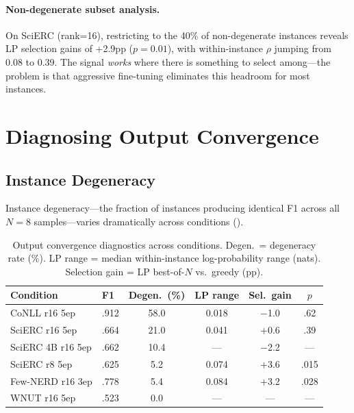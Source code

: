\documentclass[11pt,a4paper]{article}
\begin{document}
\paragraph{Non-degenerate subset analysis.}
On SciERC (rank=16), restricting to the 40\% of non-degenerate instances reveals LP selection gains of +2.9pp ($p{=}0.01$), with within-instance $\rho$ jumping from 0.08 to 0.39.
The signal \emph{works} where there is something to select among---the problem is that aggressive fine-tuning eliminates this headroom for most instances.

\section{Diagnosing Output Convergence}

\subsection{Instance Degeneracy}

Instance degeneracy---the fraction of instances producing identical F1 across all $N{=}8$ samples---varies dramatically across conditions ().

\begin{table}[t]
\centering
\small
\caption{Output convergence diagnostics across conditions. Degen.\ = degeneracy rate (\%). LP range = median within-instance log-probability range (nats). Selection gain = LP best-of-$N$ vs.\ greedy (pp).}
\label{tab:convergence}
\begin{tabular}{llcccc}
\toprule
\textbf{Condition} & \textbf{F1} & \textbf{Degen.\ (\%)} & \textbf{LP range} & \textbf{Sel.\ gain} & \textbf{$p$} \\
\midrule
CoNLL r16 5ep         & .912 & 58.0 & 0.018 & $-$1.0 & .62 \\
SciERC r16 5ep        & .664 & 21.0 & 0.041 & +0.6  & .39 \\
SciERC 4B r16 5ep     & .662 & 10.4 & ---   & $-$2.2 & --- \\
SciERC r8 5ep         & .625 &  5.2 & 0.074 & +3.6  & .015 \\
Few-NERD r16 3ep      & .778 &  5.4 & 0.084 & +3.2  & .028 \\
WNUT r16 5ep          & .523 &  0.0 & ---   & ---   & --- \\
\bottomrule
\end{tabular}
\end{table}
\end{document}

